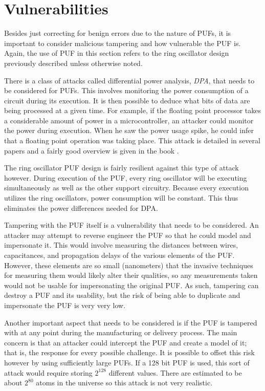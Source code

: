 \section{Vulnerabilities}
Besides just correcting for benign errors due to the nature of PUFs, it is important to consider
malicious tampering and how vulnerable the PUF is. Again, the use of PUF in this section refers
to the ring oscillator design previously described unless otherwise noted.

There is a class of attacks called differential power analysis, \textit{DPA}, that needs to be considered
for PUFs. This involves monitoring the power consumption of a circuit during its execution. It is then possible
to deduce what bits of data are being processed at a given time. For example, if the floating point processor
takes a considerable amount of power in a microcontroller, an attacker could monitor the power during execution.
When he saw the power usage spike, he could infer that a floating point operation was taking place. This attack
is detailed in several papers and a fairly good overview is given in the book \cite{securityengineering}.

The ring oscillator PUF design is fairly resilient against this type of attack however. During execution of the
PUF, every ring oscillator will be executing simultaneously as well as the other support circuitry. Because
every execution utilizes the ring oscillators, power consumption will be constant. This thus eliminates the
power differences needed for DPA.

Tampering with the PUF itself is a vulnerability that needs to be considered. An attacker may attempt
to reverse engineer the PUF so that he could model and impersonate it. This would involve measuring
the distances between wires, capacitances, and propagation delays of the various elements of the PUF.
However, these elements are so small (nanometers) that the invasive techniques for measuring them
would likely alter their qualities, so any measurements taken would not be usable for impersonating
the original PUF. As such, tampering can destroy a PUF and its usability, but the risk of being able
to duplicate and impersonate the PUF is very very low.

Another important aspect that needs to be considered is if the PUF is tampered with at any point
during the manufacturing or delivery process. The main concern is that an attacker could intercept
the PUF and create a model of it; that is, the response for every possible challenge. It is possible to
offset this risk however by using sufficiently large PUFs. If a 128 bit PUF is used, this sort of attack
would require storing $2^{128}$ different values. There are estimated to be about $2^{80}$ atoms
in the universe so this attack is not very realistic.

